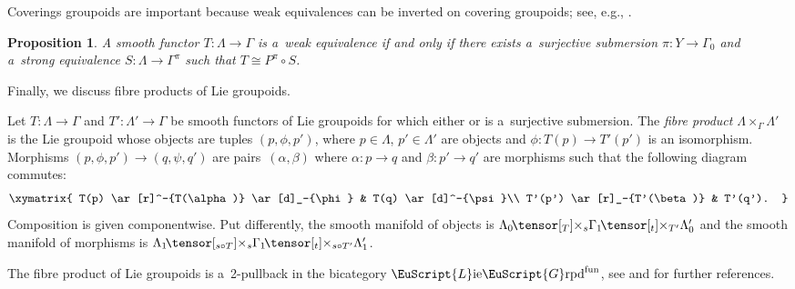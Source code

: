 \documentclass[10pt,a4paper]{amsart}
\numberwithin{equation}{section}
\newtheorem{Proposition}[Theorem]{Proposition}
 { \theoremstyle{definition}
\newtheorem{Definition}[Theorem]{Definition}
\newtheorem{Example}[Theorem]{Example}
\newtheorem{Remark}[Theorem]{Remark} }
\def\mathscr#1{\EuScript{#1}}
\def\liegrpd{\mathscr{L}\text{ie}\mathscr{G}\text{rpd}}
\def\ttimes#1#2{\hspace{-0.15em}\tensor[_{#1}]{\times}{_{#2}}}
\newcommand{\pr}{\operatorname{pr}}
\begin{document}
Coverings groupoids are important because weak equivalences can be inverted on covering groupoids; see, e.g., \cite[Proposition 5.7]{nikolaus2}.
\begin{Proposition} \label{Lemma: Extracting covering groupoids from weak equivalences}
 A smooth functor $T \colon \Lambda \to \Gamma$ is a~weak equivalence if and only if there exists a~surjective submersion $\pi \colon Y \to \Gamma_0$ and a~strong equivalence
 $S \colon \Lambda \to \Gamma^\pi$ such that $T \cong P^{\pi} \circ S$.
\end{Proposition}

Finally, we discuss fibre products of Lie groupoids.

\begin{Definition}
\label{definition: fibre product of Lie groupoids}
 Let $T\colon \Lambda \to \Gamma$ and $T' \colon \Lambda' \to \Gamma$ be smooth functors of Lie groupoids for which either
 \smash{$t \circ \pr_{\Gamma_1} \colon \Lambda_0 \ttimes{T_0}{s} \Gamma_1 \to \Gamma_0$} or \smash{$s \circ \pr_{\Gamma_1} \colon \Lambda_0' \ttimes{T_0'}{t} \Gamma_1 \to \Gamma_0$}
 is a~surjective submersion. The \emph{fibre product} $\Lambda \times_{\Gamma} \Lambda'$
 is the Lie groupoid whose objects are tuples $(p,\phi,p')$, where $p \in \Lambda$, $p' \in \Lambda'$ are objects and $\phi \colon T(p) \to T'(p')$ is an isomorphism.
 Morphisms $(p,\phi,p') \to (q,\psi,q')$ are pairs~${(\alpha,\beta)}$ where $\alpha \colon p \to q$ and $\beta\colon p' \to q'$ are morphisms such that
 the following diagram commutes:
 \begin{equation*}
 \xymatrix{
 T(p) \ar[r]^-{T(\alpha)} \ar[d]_-{\phi} & T(q) \ar[d]^-{\psi}\\
 T'(p') \ar[r]_-{T'(\beta)} & T'(q').
 }
 \end{equation*}
 Composition is given componentwise. Put differently, the smooth manifold of objects is $\Lambda_0 \ttimes{T}{s} \Gamma_1 \ttimes{t}{T'} \Lambda_0'$ and
 the smooth manifold of morphisms is $\Lambda_1 \ttimes{s \circ T}{s} \Gamma_1 \ttimes{t}{s \circ T'} \Lambda_1'$.

\end{Definition}
\begin{Remark}\label{Remark: the fibre product is a 2-pullback}
 The fibre product of Lie groupoids is a~2-pullback in the bicategory $\liegrpd^{\rm fun}$, see \cite[Section~5.3]{Moerdijk2003foliations} and
 \cite[Remark 1.18]{DuLi2014} for further references.
\end{Remark}
\end{document}
